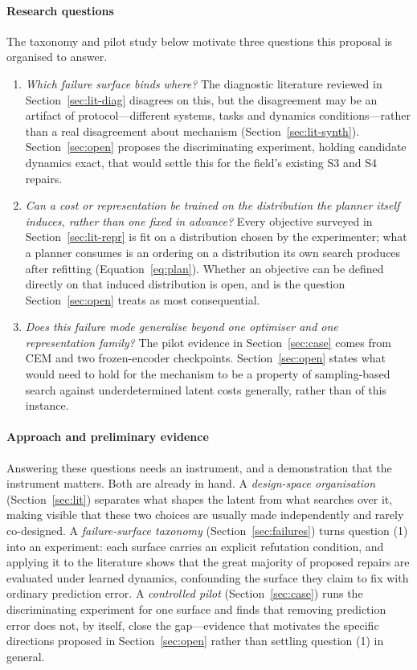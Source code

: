 \documentclass[11pt,letterpaper]{article}
\begin{document}
\paragraph{Research questions}
The taxonomy and pilot study below motivate three questions this proposal is
organised to answer.
\begin{enumerate}[label=(\arabic*)]
\item \emph{Which failure surface binds where?} The diagnostic literature
reviewed in Section~\ref{sec:lit-diag} disagrees on this, but the disagreement
may be an artifact of protocol---different systems, tasks and dynamics
conditions---rather than a real disagreement about mechanism
(Section~\ref{sec:lit-synth}). Section~\ref{sec:open} proposes the
discriminating experiment, holding candidate dynamics exact, that would settle
this for the field's existing S3 and S4 repairs.
\item \emph{Can a cost or representation be trained on the distribution the
planner itself induces, rather than one fixed in advance?} Every objective
surveyed in Section~\ref{sec:lit-repr} is fit on a distribution chosen by the
experimenter; what a planner consumes is an ordering on a distribution its own
search produces after refitting (Equation~\eqref{eq:plan}). Whether an objective
can be defined directly on that induced distribution is open, and is the
question Section~\ref{sec:open} treats as most consequential.
\item \emph{Does this failure mode generalise beyond one optimiser and one
representation family?} The pilot evidence in Section~\ref{sec:case} comes from
CEM and two frozen-encoder checkpoints. Section~\ref{sec:open} states what would
need to hold for the mechanism to be a property of sampling-based search against
underdetermined latent costs generally, rather than of this instance.
\end{enumerate}

\paragraph{Approach and preliminary evidence}
Answering these questions needs an instrument, and a demonstration that the
instrument matters. Both are already in hand. A \emph{design-space organisation}
(Section~\ref{sec:lit}) separates what shapes the latent from what searches over
it, making visible that these two choices are usually made independently and
rarely co-designed. A \emph{failure-surface taxonomy}
(Section~\ref{sec:failures}) turns question (1) into an experiment: each surface
carries an explicit refutation condition, and applying it to the literature
shows that the great majority of proposed repairs are evaluated under learned
dynamics, confounding the surface they claim to fix with ordinary prediction
error. A \emph{controlled pilot} (Section~\ref{sec:case}) runs the
discriminating experiment for one surface and finds that removing prediction
error does not, by itself, close the gap---evidence that motivates the specific
directions proposed in Section~\ref{sec:open} rather than settling question (1)
in general.
\end{document}
